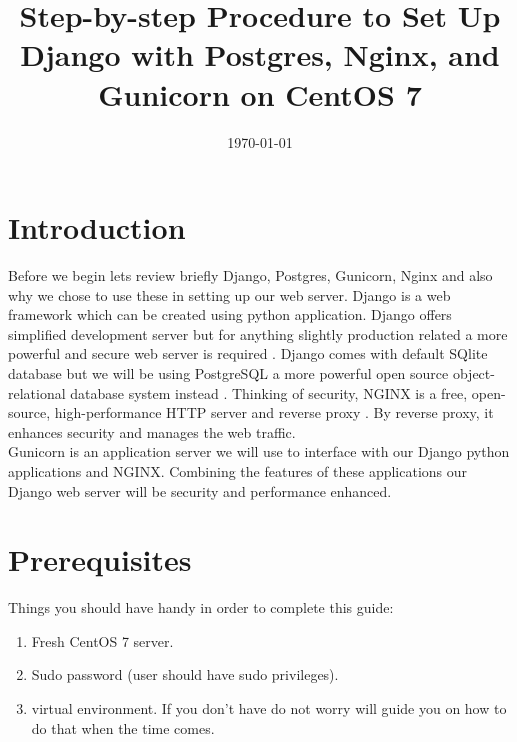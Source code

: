 \documentclass[a4paper]{article}
\title{Step-by-step Procedure to Set Up Django with Postgres, Nginx, and Gunicorn on CentOS 7}
\date{\today}
\begin{document}
\maketitle

\section*{Introduction}
 \label{introduction}
Before we begin lets review briefly Django, Postgres, Gunicorn, Nginx and also why we chose to use these in
setting up our web server.  Django is a web framework which can be created using python application. Django
offers simplified development server but for anything slightly production related a more powerful and
secure web server is required \cite{DigitalOceaInc}. 
Django comes with default SQlite database but we will be using PostgreSQL a more powerful open source
object-relational database system instead \cite{ThePostgreSQLGlobalDevelopmentGroup}. Thinking of security, NGINX is a free, open-source, high-performance HTTP server and reverse proxy \cite{NGINXInc}. By reverse proxy, it enhances security and manages the web
traffic.\\ 
Gunicorn is an application server we will use to interface with our Django python applications and NGINX. Combining the features of these applications our Django web server will be security and performance enhanced. \par

\section* {Prerequisites}
\label{prerequisite}
Things you should have handy in order to complete this guide:

\begin{enumerate}
	\item Fresh CentOS 7 server.
	\item Sudo password (user should have sudo privileges).
	\item virtual environment. If you don't have do not worry will guide you on how to do that when the time comes.
\end{enumerate}










	\newpage	
	
		
	\clearpage 
\end{document}
